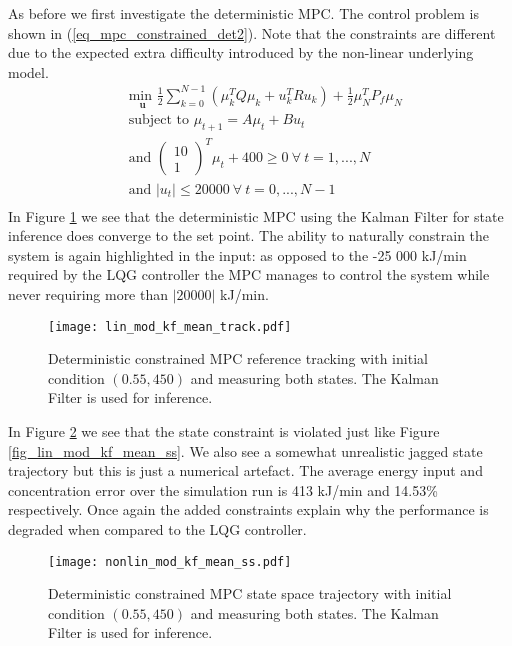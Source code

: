As before we first investigate the deterministic MPC. The control problem is shown in (\ref{eq_mpc_constrained_det2}). Note that the constraints are different due to the expected extra difficulty introduced by the non-linear underlying model. 
\begin{equation}
\begin{aligned}
&\underset{\mathbf{u}}{\text{min }} \frac{1}{2}\sum_{k=0}^{N-1} \left( \mu_k^TQ\mu_k + u_k^TRu_k \right) + \frac{1}{2}\mu_N^TP_f\mu_N \\
& \text{subject to } \mu_{t+1}=A\mu_t + Bu_t \\
&\text{and } \begin{pmatrix}
10 \\ 1
\end{pmatrix}^T \mu_t + 400 \geq 0 ~\forall ~t=1,...,N\\
& \text{and } |u_t| \leq 20000 ~\forall ~t=0,...,N-1\\
\end{aligned}
\label{eq_mpc_constrained_det2}
\end{equation}
In Figure \ref{fig_nonlin_mod_kf_mean_track} we see that the deterministic MPC using the Kalman Filter for state inference does converge to the set point. The ability to naturally constrain the system is again highlighted in the input: as opposed to the -25 000 kJ/min required by the LQG controller the MPC manages to control the system while never requiring more than $|20000|$ kJ/min. 
\begin{figure}[H] 
\centering
\texttt{[image: lin\_mod\_kf\_mean\_track.pdf]}
\caption{Deterministic constrained MPC reference tracking with initial condition $(0.55, 450)$ and measuring both states. The Kalman Filter is used for inference.}
\label{fig_nonlin_mod_kf_mean_track}
\end{figure} 
In Figure \ref{fig_nonlin_mod_kf_mean_ss} we see that the state constraint is violated just like Figure \ref{fig_lin_mod_kf_mean_ss}. We also see a somewhat unrealistic jagged state trajectory but this is just a numerical artefact. The average energy input and concentration error over the simulation run is 413 kJ/min and 14.53\% respectively. Once again the added constraints explain why the performance is degraded when compared to the LQG controller.
\begin{figure}[H] 
\centering
\texttt{[image: nonlin\_mod\_kf\_mean\_ss.pdf]}
\caption{Deterministic constrained MPC state space trajectory with initial condition $(0.55, 450)$ and measuring both states. The Kalman Filter is used for inference.}
\label{fig_nonlin_mod_kf_mean_ss}
\end{figure}
